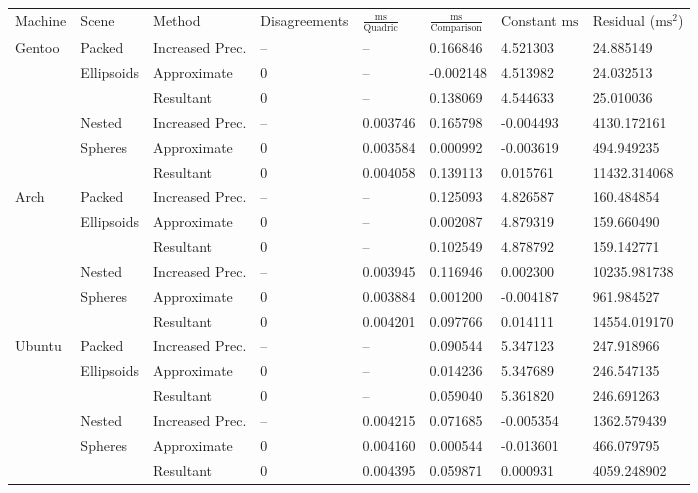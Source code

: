 \begin{tabular}{|l|l|ll|lll|l|}
\hline
Machine & Scene & Method & Disagreements & $\frac{\text{ms}}{\text{Quadric}}$ & $\frac{\text{ms}}{\text{Comparison}}$ & Constant $\text{ms}$ & Residual ($\text{ms}^2$)\\
\hhline{|=|=|==|===|=|}
Gentoo & Packed & Increased Prec. & -- & -- & 0.166846 & 4.521303 & 24.885149\\
& Ellipsoids & Approximate & 0 & -- & -0.002148 & 4.513982 & 24.032513\\
&& Resultant & 0 & -- & 0.138069 & 4.544633 & 25.010036\\
\hline
& Nested & Increased Prec. & -- & 0.003746 & 0.165798 & -0.004493 & 4130.172161\\
& Spheres & Approximate & 0 & 0.003584 & 0.000992 & -0.003619 & 494.949235\\
&& Resultant & 0 & 0.004058 & 0.139113 & 0.015761 & 11432.314068\\
\hline
Arch & Packed & Increased Prec. & -- & -- & 0.125093 & 4.826587 & 160.484854\\
& Ellipsoids & Approximate & 0 & -- & 0.002087 & 4.879319 & 159.660490\\
&& Resultant & 0 & -- & 0.102549 & 4.878792 & 159.142771\\
\hline
& Nested & Increased Prec. & -- & 0.003945 & 0.116946 & 0.002300 & 10235.981738\\
& Spheres & Approximate & 0 & 0.003884 & 0.001200 & -0.004187 & 961.984527\\
&& Resultant & 0 & 0.004201 & 0.097766 & 0.014111 & 14554.019170\\
\hline
Ubuntu & Packed & Increased Prec. & -- & -- & 0.090544 & 5.347123 & 247.918966\\
& Ellipsoids & Approximate & 0 & -- & 0.014236 & 5.347689 & 246.547135\\
&& Resultant & 0 & -- & 0.059040 & 5.361820 & 246.691263\\
\hline
& Nested & Increased Prec. & -- & 0.004215 & 0.071685 & -0.005354 & 1362.579439\\
& Spheres & Approximate & 0 & 0.004160 & 0.000544 & -0.013601 & 466.079795\\
&& Resultant & 0 & 0.004395 & 0.059871 & 0.000931 & 4059.248902\\
\hline
\end{tabular}
